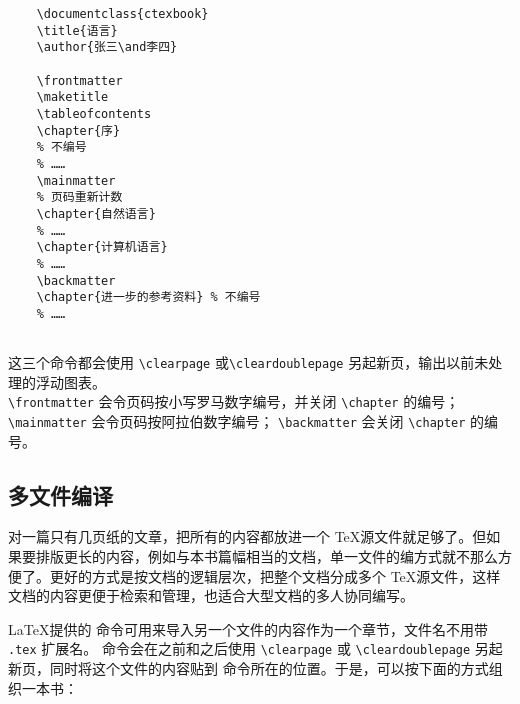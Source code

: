 \begin{lstlisting}
    \documentclass{ctexbook}
    \title{语言}
    \author{张三\and李四}
    
    \frontmatter
    \maketitle
    \tableofcontents
    \chapter{序}
    % 不编号
    % ……
    \mainmatter
    % 页码重新计数
    \chapter{自然语言}
    % ……
    \chapter{计算机语言}
    % ……
    \backmatter
    \chapter{进一步的参考资料} % 不编号
    % ……
    
\end{lstlisting}

这三个命令都会使用 \verb|\clearpage| 或\verb|\cleardoublepage| 另起新页，输出以前未处理的浮动图表。\\ \verb|\frontmatter| 会令页码按小写罗马数字编号，并关闭 \verb|\chapter| 的编号； \verb|\mainmatter| 会令页码按阿拉伯数字编号； \verb|\backmatter| 会关闭 \verb|\chapter| 的编号。

\subsection{多文件编译}

对一篇只有几页纸的文章，把所有的内容都放进一个 \TeX 源文件就足够了。但如果要排版更长的内容，例如与本书篇幅相当的文档，单一文件的编方式就不那么方便了。更好的方式是按文档的逻辑层次，把整个文档分成多个 \TeX 源文件，这样文档的内容更便于检索和管理，也适合大型文档的多人协同编写。

\LaTeX 提供的 \verb|| 命令可用来导入另一个文件的内容作为一个章节，文件名不用带 \verb|.tex| 扩展名。\verb|| 命令会在之前和之后使用 \verb|\clearpage| 或
\verb|\cleardoublepage| 另起新页，同时将这个文件的内容贴到 \verb|| 命令所在的位置。于是，可以按下面的方式组织一本书：

